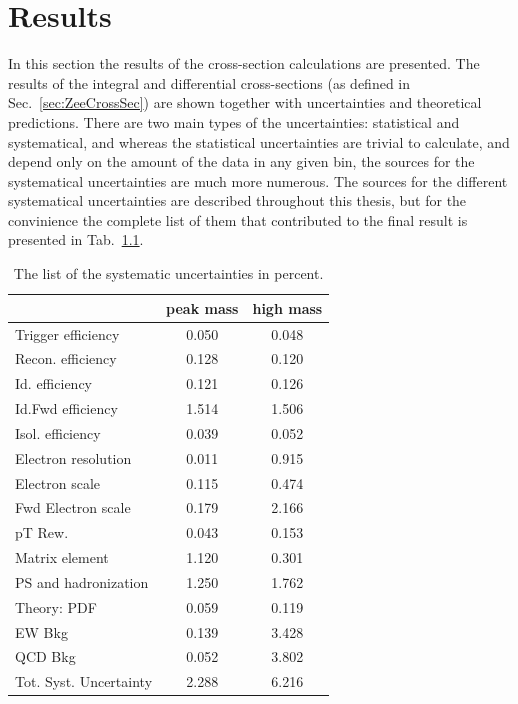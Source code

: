 \chapter{Results}
\label{sec:Results}

In this section the results of the cross-section calculations are presented. The results of the integral and differential cross-sections (as defined in Sec.~\ref{sec:ZeeCrossSec}) are shown together with uncertainties and theoretical predictions. There are two main types of the uncertainties: statistical and systematical, and whereas the statistical uncertainties are trivial to calculate, and depend only on the amount of the data in any given bin, the sources for the systematical uncertainties are much more numerous. The sources for the different systematical uncertainties are described throughout this thesis, but for the convinience the complete list of them that contributed to the final result is presented in Tab.~\ref{tab:Zee_unc_list}.

\begin{table}
\centering
\begin{tabular}{lcc}
\hline
   & peak mass & high mass  \\
\hline
Trigger efficiency                       & 0.050 & 0.048 \\
Recon. efficiency                        & 0.128 & 0.120 \\
Id. efficiency                           & 0.121 & 0.126 \\
Id.Fwd efficiency                        & 1.514 & 1.506 \\
Isol. efficiency                         & 0.039 & 0.052 \\
Electron resolution                      & 0.011 & 0.915 \\
Electron scale                           & 0.115 & 0.474 \\
Fwd Electron scale                       & 0.179 & 2.166 \\
pT Rew.                                  & 0.043 & 0.153 \\
Matrix element                           & 1.120 & 0.301 \\
PS and hadronization                     & 1.250 & 1.762 \\
Theory: PDF                              & 0.059 & 0.119 \\
EW Bkg                                   & 0.139 & 3.428 \\
QCD Bkg                                  & 0.052 & 3.802 \\
\hline
Tot. Syst. Uncertainty                   & 2.288 & 6.216 \\
\hline
\end{tabular}
\caption{The list of the systematic uncertainties in percent.}
\label{tab:Zee_unc_list}
\end{table}

